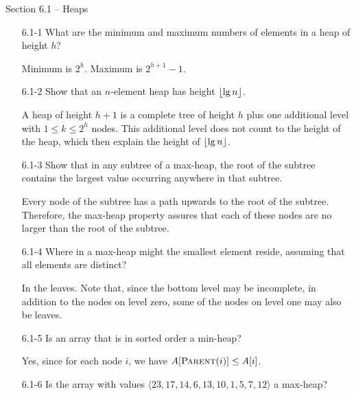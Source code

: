 
{\large Section 6.1 {--} Heaps}

\begin{enumerate}

\item[6.1{-}1]{What are the minimum and maximum numbers of elements in a heap of
height $h$?}

\begin{framed}
Minimum is $2^{h}$. Maximum is $2^{h + 1} - 1$.
\end{framed}

\item[6.1{-}2]{Show that an $n$-element heap has height $\lfloor\lg n\rfloor$.}

\begin{framed}
A heap of height $h + 1$ is a complete tree of height $h$ plus one additional
level with $1 \le k \le 2^h$ nodes. This additional level does not count to the
height of the heap, which then explain the height of $\lfloor\lg n\rfloor$.
\end{framed}

\item[6.1{-}3]{Show that in any subtree of a max-heap, the root of the subtree
contains the largest value occurring anywhere in that subtree.}

\begin{framed}
  Every node of the subtree has a path upwards to the root of the subtree.
  Therefore, the max-heap property assures that each of these nodes are no
  larger than the root of the subtree.
\end{framed}

\item[6.1{-}4]{Where in a max-heap might the smallest element reside, assuming
that all elements are distinct?}

\begin{framed}
In the leaves. Note that, since the bottom level may be incomplete, in addition
to the nodes on level zero, some of the nodes on level one may also be leaves.
\end{framed}

\item[6.1{-}5]{Is an array that is in sorted order a min-heap?}

\begin{framed}
Yes, since for each node $i$, we have $A[\textsc{Parent}(i)] \le A[i]$.
\end{framed}

\item[6.1{-}6]{Is the array with values
$\langle 23, 17, 14, 6, 13, 10, 1, 5, 7, 12 \rangle$ a max-heap?}


\end{enumerate}
